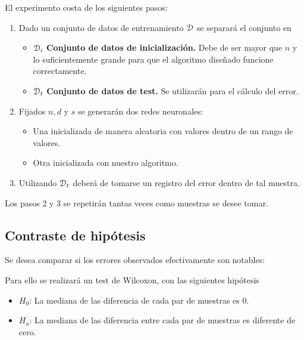 El experimento costa de los siguientes pasos: 

\begin{enumerate}
\item Dado un conjunto de datos de entrenamiento $\mathcal{D}$  se separará el conjunto en
\begin{itemize}
    \item $\mathcal{D}_i$ \textbf{Conjunto de 
    datos de inicialización.} Debe de ser mayor que 
    $n$ y lo suficientemente grande para que el algoritmo diseñado funcione correctamente. 

    \item $\mathcal{D}_t$ \textbf{Conjunto de 
    datos de test.} Se utilizarán para el cálculo del error. 
\end{itemize}  

\item Fijados $n, d$ y $s$ se generarán dos redes neuronales: 

\begin{itemize}
    \item Una inicializada de manera aleatoria con valores dentro de un rango de valores. 
    
    \item  Otra inicializada con nuestro algoritmo. 
\end{itemize}

\item Utilizando $\mathcal{D}_t$ deberá de tomarse un registro del error dentro de tal muestra. 
\end{enumerate}

Los pasos 2 y 3 se repetirán tantas veces como 
muestras se desee tomar. 

\subsection{Contraste de hipótesis}

Se desea comparar si los errores observados efectivamente son notables: 

Para ello se realizará un test de Wilcoxon, con las siguientes hipótesis

\begin{itemize}
    \item $H_0$: La mediana de las diferencia de cada par de muestras es $0$. 
    \item $H_a$: La mediana de las diferencia entre cada par de muestras es diferente de cero. 
\end{itemize}

